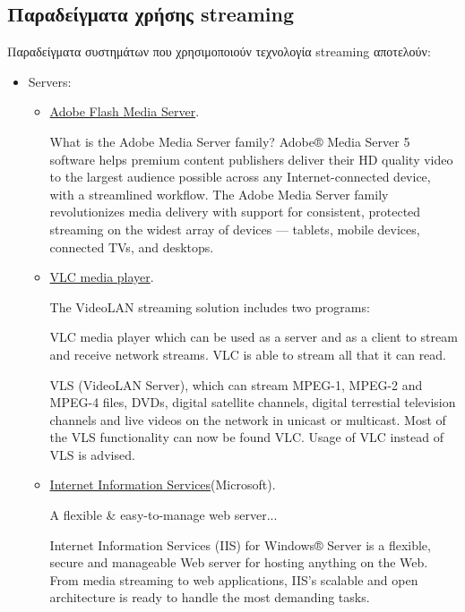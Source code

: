 \subsection{Παραδείγματα χρήσης streaming}
Παραδείγματα συστημάτων που χρησιμοποιούν τεχνολογία streaming αποτελούν\cite{wiki:list-streaming}:
\begin{itemize}
    \item Servers:
    \begin{itemize}
        \item \href{http://www.adobe.com/products/adobe-media-server-family.html}{Adobe Flash Media Server}.
        \begin{displayquote}
What is the Adobe Media Server family?
Adobe® Media Server 5 software helps premium content publishers deliver their HD quality video to the largest audience possible across any Internet-connected device, with a streamlined workflow. The Adobe Media Server family revolutionizes media delivery with support for consistent, protected streaming on the widest array of devices — tablets, mobile devices, connected TVs, and desktops.
        \end{displayquote}
        \item \href{http://www.videolan.org/vlc/streaming.html}{VLC media player}.
        \begin{displayquote}
The VideoLAN streaming solution includes two programs:

VLC media player which can be used as a server and as a client to stream and receive network streams. VLC is able to stream all that it can read.

VLS (VideoLAN Server), which can stream MPEG-1, MPEG-2 and MPEG-4 files, DVDs, digital satellite channels, digital terrestial television channels and live videos on the network in unicast or multicast. Most of the VLS functionality can now be found VLC. Usage of VLC instead of VLS is advised.
        \end{displayquote}
        \item \href{http://www.iis.net/}{Internet Information Services}(Microsoft).
        \begin{displayquote}
A flexible \& easy-to-manage web server...

Internet Information Services (IIS) for Windows® Server is a flexible, secure and manageable Web server for hosting anything on the Web. From media streaming to web applications, IIS's scalable and open architecture is ready to handle the most demanding tasks.
        \end{displayquote}
    \end{itemize}


\end{itemize}
